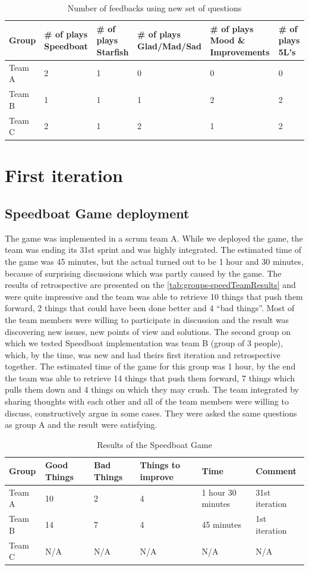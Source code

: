 \begin{table}[!htbp]
	\caption{Number of feedbacks using new set of questions}
	\label{tab:groups-nPlaysNewSet}
	\begin{tabularx}{\textwidth}{|X|X|X|X|X|X|}
	\hline
		Group & \# of plays Speedboat & \# of plays Starfish & \# of plays Glad/Mad/Sad & \# of plays Mood \& Improvements & \# of plays 5L's \\ \hline
		Team A & 2 & 1 & 0 & 0 & 0 \\ \hline
		Team B & 1 & 1 & 1 & 2 & 2\\ \hline
        Team C & 2 & 1 & 2 & 1 & 2 \\ \hline
	\end{tabularx}
\end{table}

\section{First iteration}
\label{sec:firstIt}
\subsection{Speedboat Game deployment}
The game was implemented in a scrum team A. While we deployed the game, the team was ending its 31st sprint and was highly integrated. The estimated time of the game was 45 minutes, but the actual turned out to be 1 hour and 30 minutes, because of surprising discussions which was partly caused by the game. The results of retrospective are presented on the \autoref{tab:groups-speedTeamResults} and were quite impressive and the team was able to retrieve 10 things that push them forward, 2 things that could have been done better and 4 “bad things”. Most of the team members were willing to participate in discussion and the result was discovering new issues, new points of view and solutions.
The second group on which we tested Speedboat implementation was team B (group of 3 people), which, by the time, was new and had theirs first iteration and retrospective together. The estimated time of the game for this group was 1 hour, by the end the team was able to retrieve 14 things that push them forward, 7 things which pulls them down and 4 things on which they may crush. The team integrated by sharing thoughts with each other and all of the team members were willing to discuss, constructively argue in some cases. They were asked the same questions as group A and the result were satisfying. 

\begin{table}[!htbp]
	\caption{Results of the Speedboat Game}
	\label{tab:groups-speedTeamResults}
	\begin{tabularx}{\textwidth}{|X|X|X|X|X|X|}
	\hline
		Group & Good Things & Bad Things & Things to improve & Time & Comment\\ \hline
		Team A & 10 & 2 & 4 & 1 hour 30 minutes & 31st iteration \\ \hline
		Team B & 14 & 7 & 4 & 45 minutes & 1st iteration\\ \hline
        Team C & N/A & N/A & N/A & N/A & N/A\\ \hline
	\end{tabularx}
\end{table}

